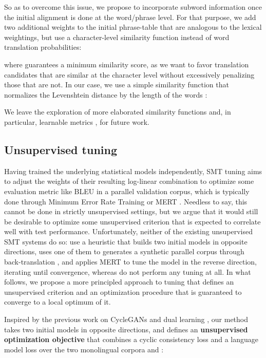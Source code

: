 \documentclass[11pt,a4paper]{article}
\begin{document}
So as to overcome this issue, we propose to incorporate subword information once the initial alignment is done at the word/phrase level. For that purpose, we add two additional weights to the initial phrase-table that are analogous to the lexical weightings, but use a character-level similarity function instead of word translation probabilities:

where  guarantees a minimum similarity score, as we want to favor translation candidates that are similar at the character level without excessively penalizing those that are not. In our case, we use a simple similarity function that normalizes the Levenshtein distance   \citep{levenshtein1966binary} by the length of the words :

We leave the exploration of more elaborated similarity functions and, in particular, learnable metrics \citep{mccallum2005conditional}, for future work.


\subsection{Unsupervised tuning} \label{subsec:tuning}

Having trained the underlying statistical models independently, SMT tuning aims to adjust the weights of their resulting log-linear combination to optimize some evaluation metric like BLEU in a parallel validation corpus, which is typically done through Minimum Error Rate Training or MERT \citep{och2003MERT}. Needless to say, this cannot be done in strictly unsupervised settings, but we argue that it would still be desirable to optimize some unsupervised criterion that is expected to correlate well with test performance. Unfortunately, neither of the existing unsupervised SMT systems do so: \citet{artetxe2018usmt} use a heuristic that builds two initial models in opposite directions, uses one of them to generates a synthetic parallel corpus through back-translation \citep{sennrich2016improving}, and applies MERT to tune the model in the reverse direction, iterating until convergence, whereas \citet{lample2018phrase} do not perform any tuning at all. In what follows, we propose a more principled approach to tuning that defines an unsupervised criterion and an optimization procedure that is guaranteed to converge to a local optimum of it.

Inspired by the previous work on CycleGANs \citep{zhu2017unpaired} and dual learning \citep{he2016dual}, our method takes two initial models in opposite directions, and defines an \textbf{unsupervised optimization objective} that combines a cyclic consistency loss and a language model loss over the two monolingual corpora  and :
\end{document}
